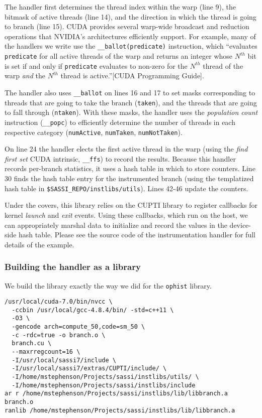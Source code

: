 The handler first determines the thread index within the warp (line
9), the bitmask of active threads (line 14), and the direction in
which the thread is going to branch (line 15). CUDA provides several
warp-wide broadcast and reduction operations that NVIDIA's
architectures efficiently support.  For example, many of the handlers
we write use the \texttt{\_\_ballot(predicate)} instruction, which
``evaluates \texttt{predicate} for all active threads of the warp and
returns an integer whose $N^{th}$ bit is set if and only if
\texttt{predicate} evaluates to non-zero for the $N^{th}$ thread of
the warp \emph{and} the $N^{th}$ thread is active.''[CUDA Programming Guide].

The handler also uses \texttt{\_\_ballot} on lines 16 and 17 to set
masks corresponding to threads that are going to take the branch
(\texttt{taken}), and the threads that are going to fall through
(\texttt{ntaken}).  With these masks, the handler uses the
\emph{population count} instruction (\texttt{\_\_popc}) to efficiently
determine the number of threads in each respective category
(\texttt{numActive}, \texttt{numTaken}, \texttt{numNotTaken}).

On line 24 the handler elects the first active thread in the warp
(using the \emph{find first set} CUDA intrinsic, \texttt{\_\_ffs}) to
record the results. Because this handler records
per-branch statistics, it uses a hash table in which to store
counters. Line 30 finds the hash table entry for the instrumented
branch (using the templatized hash table in
\texttt{\$SASSI\_REPO/instlibs/utils}).  Lines 42-46 update the
counters.

Under the covers, this library relies on the CUPTI library to register
callbacks for kernel \emph{launch} and \emph{exit} events.  Using
these callbacks, which run on the host, we can appropriately marshal
data to initialize and record the values in the device-side hash
table.  Please see the source code of the instrumentation handler for
full details of the example.

\subsubsection{Building the handler as a library}

We build the library exactly the way we did for the \texttt{ophist}
library.

\begin{lstlisting}[style=BashInputStyle]
/usr/local/cuda-7.0/bin/nvcc \
  -ccbin /usr/local/gcc-4.8.4/bin/ -std=c++11 \
  -O3 \
  -gencode arch=compute_50,code=sm_50 \
  -c -rdc=true -o branch.o \
  branch.cu \
  --maxrregcount=16 \
  -I/usr/local/sassi7/include \
  -I/usr/local/sassi7/extras/CUPTI/include/ \
  -I/home/mstephenson/Projects/sassi/instlibs/utils/ \
  -I/home/mstephenson/Projects/sassi/instlibs/include
ar r /home/mstephenson/Projects/sassi/instlibs/lib/libbranch.a branch.o
ranlib /home/mstephenson/Projects/sassi/instlibs/lib/libbranch.a
\end{lstlisting}

